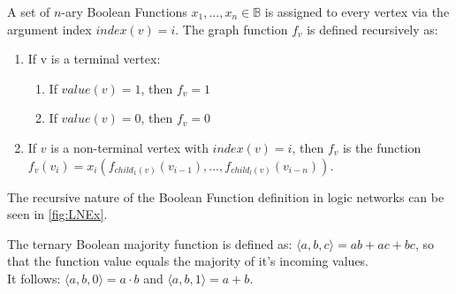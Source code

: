 \begin{definition}
	A set of $n$-ary Boolean Functions $x_1, ..., x_n \in \mathbb{B}$ is assigned to every vertex via the argument index $index(v) = i$. The graph function $f_v$ is defined recursively as:
	\begin{enumerate}
		\item If v is a terminal vertex:
		\begin{enumerate}
			\item If $value(v)=1$, then $f_v=1$
			\item If $value(v)=0$, then $f_v=0$
		\end{enumerate}
		\item If $v$ is a non-terminal vertex with $index(v)=i$, then $f_v$ is the function \\ 
		$f_v(v_i) = x_i(f_{child_1(v)}(v_{i-1}), ..., f_{child_l(v)}(v_{i-n}))$.
	\end{enumerate}
\end{definition}

The recursive nature of the Boolean Function definition in logic networks can be seen in \ref*{fig:LNEx}.

\begin{definition}\label{Def:majf}
	The ternary Boolean majority function is defined as: $\langle a, b, c \rangle = ab + ac + bc$, so that the function value equals the majority of it's incoming values.\\
	It follows: $\langle a, b, 0 \rangle = a \cdot b$ and $\langle a, b, 1 \rangle = a + b$.
\end{definition}

